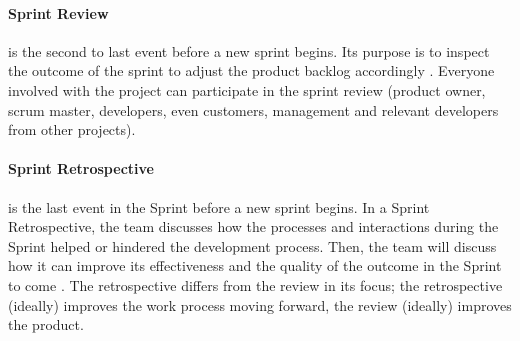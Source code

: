 \paragraph{Sprint Review}
is the second to last event before a new sprint begins.
Its purpose is to inspect the outcome of the sprint to adjust the product backlog accordingly \cite{schwaber_sutherland_2022}.
Everyone involved with the project can participate in the sprint review (product owner, scrum master, developers, even customers, management and relevant developers from other projects).

\paragraph{Sprint Retrospective}
is the last event in the Sprint before a new sprint begins.
In a Sprint Retrospective, the team discusses how the processes and interactions during the Sprint helped or hindered the development process. 
Then, the team will discuss how it can improve its effectiveness and the quality of the outcome in the Sprint to come \cite{schwaber_sutherland_2022}.
The retrospective differs from the review in its focus; the retrospective (ideally) improves the work process moving forward, the review (ideally) improves the product.

